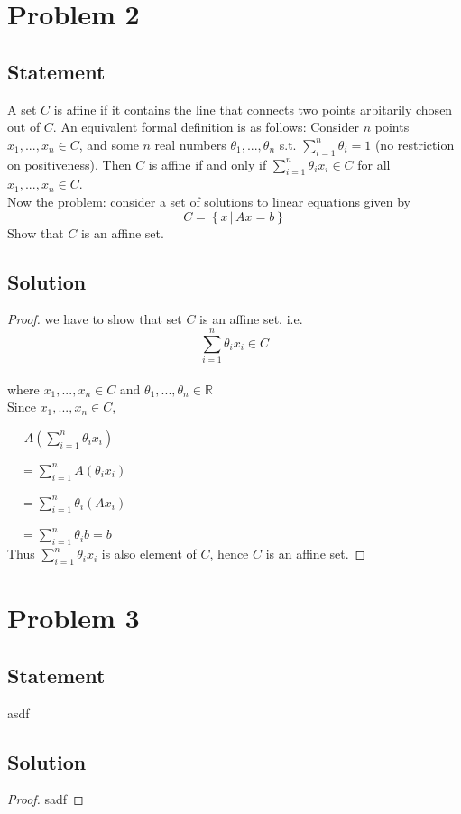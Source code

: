 \documentclass[12pt]{article}
\theoremstyle{plain}
\newcommand{\R}{\mathbb{R}}
\begin{document}
\section*{Problem 2}
	\subsection*{Statement}
	A set $C$ is affine if it contains the line that connects two points arbitarily chosen out of $C$. An equivalent formal definition is as follows: Consider $n$ points $x_1,...,x_n\in C$, and some $n$ real numbers $\theta_1,...,\theta_n$ s.t. ${\sum_{i=1}^{n}\theta_i=1}$ (no restriction on positiveness). Then $C$ is affine if and only if ${\sum_{i=1}^n\theta_i x_i\in C}$ for all $x_1,...,x_n\in C$.
	\\Now the problem: consider a set of solutions to linear equations given by $$C=\left\{x\,|\,Ax=b\right\}$$
	Show that $C$ is an affine set.
	\subsection*{Solution}
\begin{proof}
	we have to show that set $C$ is an affine set. i.e.
	$$\displaystyle{\sum_{i=1}^{n}\theta_i x_i}\in C$$
	\\ where $x_1,...,x_n\in C$ and $\theta_1,...,\theta_n\in\R$
	\\ Since $x_1,...,x_n\in C$,
	\par~~ $A\left(\displaystyle\sum_{i=1}^{n}\theta_i x_i\right)$
	\par~~$=\displaystyle\sum_{i=1}^{n}A(\theta_i x_i)$
	\par~~$=\displaystyle\sum_{i=1}^n\theta_i(Ax_i)$
	\par~~$=\displaystyle\sum_{i=1}^n\theta_i b=b$
	\\ Thus $\displaystyle\sum_{i=1}^{n}\theta_i x_i$ is also element of $C$, hence $C$ is an affine set.
\end{proof}
\section*{Problem 3}
	\subsection*{Statement}
	asdf
	\subsection*{Solution}
	\begin{proof}
		sadf
	\end{proof}
\end{document}
